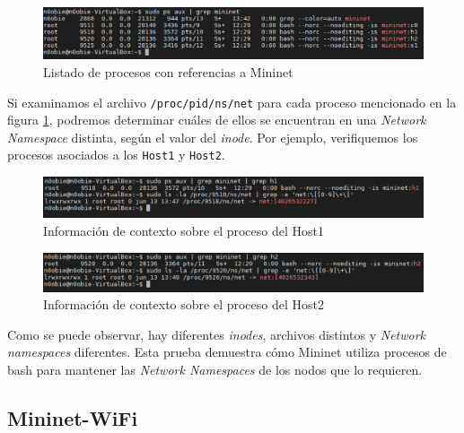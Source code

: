 \begin{figure}[ht]
    \centering
    \includegraphics[width=\textwidth]{archivos/img/teoria/mn_03.png}
    \caption{Listado de procesos con referencias a Mininet}
    \label{fig:mininet_03}
\end{figure}

Si examinamos el archivo \texttt{/proc/{pid}/ns/net} para cada proceso mencionado en la figura \ref{fig:mininet_03}, podremos determinar cuáles de ellos se encuentran en una \textit{Network Namespace} distinta, según el valor del \textit{inode}. Por ejemplo, verifiquemos los procesos asociados a los \texttt{Host1} y \texttt{Host2}.\\


\begin{figure}[ht]
    \centering
    \includegraphics[width=\textwidth]{archivos/img/teoria/mn_04.png}
    \caption{Información de contexto sobre el proceso del Host1}
    \label{fig:mininet_04}
\end{figure}

\newpage

\begin{figure}[ht]
    \centering
    \includegraphics[width=\textwidth]{archivos/img/teoria/mn_05.png}
    \caption{Información de contexto sobre el proceso del Host2}
    \label{fig:mininet_05}
\end{figure}

Como se puede observar, hay diferentes \textit{inodes}, archivos distintos y \textit{Network namespaces} diferentes. Esta prueba demuestra cómo Mininet utiliza procesos de bash para mantener las \textit{Network Namespaces} de los nodos que lo requieren.


\subsection{Mininet-WiFi}

